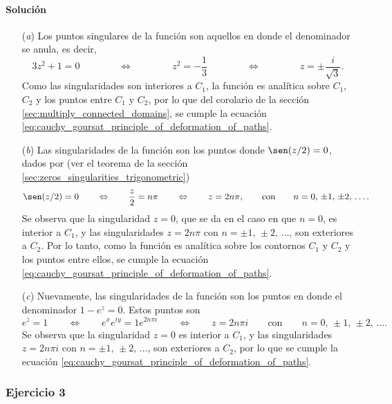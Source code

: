 \documentclass[a4paper]{report}
\begin{document}
\paragraph{Solución} 
\begin{enumerate}
 \item[(\textit{a})] Los puntos singulares de la función son aquellos en donde el denominador se anula, es decir,
 \[
  3z^2+1=0
  \qquad\qquad\Leftrightarrow\qquad\qquad
  z^2=-\frac{1}{3}
  \qquad\qquad\Leftrightarrow\qquad\qquad
  z=\pm\frac{i}{\sqrt{3}}.
 \]
 Como las singularidades son interiores a \(C_1\), la función es analítica sobre \(C_1\), \(C_2\) y los puntos entre \(C_1\) y \(C_2\), por lo que del corolario de la sección \ref{sec:multiply_connected_domains}, se cumple la ecuación \ref{eq:cauchy_goursat_principle_of_deformation_of_paths}.
 \item[(\textit{b})] Las singularidades de la función son los puntos donde \(\sen(z/2)=0\), dados por (ver el teorema de la sección \ref{sec:zeros_singularities_trigonometric})
 \[
  \sen(z/2)=0
  \qquad\Leftrightarrow\qquad
  \frac{z}{2}=n\pi
  \qquad\Leftrightarrow\qquad
  z=2n\pi,
  \qquad\textrm{con}\qquad 
  n=0,\,\pm1,\,\pm2,\,\dots.
 \]
 Se observa que la singularidad \(z=0\), que se da en el caso en que \(n=0\), es interior a \(C_1\), y las singularidades \(z=2n\pi\) con \(n=\pm1,\,\pm2,\,\dots\), son exteriores a \(C_2\). Por lo tanto, como la función es analítica sobre los contornos \(C_1\) y \(C_2\) y los puntos entre ellos, se cumple la ecuación \ref{eq:cauchy_goursat_principle_of_deformation_of_paths}.
 \item[(\textit{c})] Nuevamente, las singularidades de la función son los puntos en donde el denominador \(1-e^z=0\). Estos puntos son
 \[
  e^z=1
  \qquad\Leftrightarrow\qquad
  e^xe^{iy}=1e^{2n\pi i}
  \qquad\Leftrightarrow\qquad
  z=2n\pi i
  \qquad\textrm{con}\qquad 
  n=0,\,\pm1,\,\pm2,\,\dots.
 \]
 Se observa que la singularidad \(z=0\) es interior a \(C_1\), y las singularidades \(z=2n\pi i\) con \(n=\pm1,\,\pm2,\,\dots\), son exteriores a \(C_2\), por lo que se cumple la ecuación \ref{eq:cauchy_goursat_principle_of_deformation_of_paths}.
\end{enumerate}

\subsubsection*{Ejercicio 3}
\end{document}

